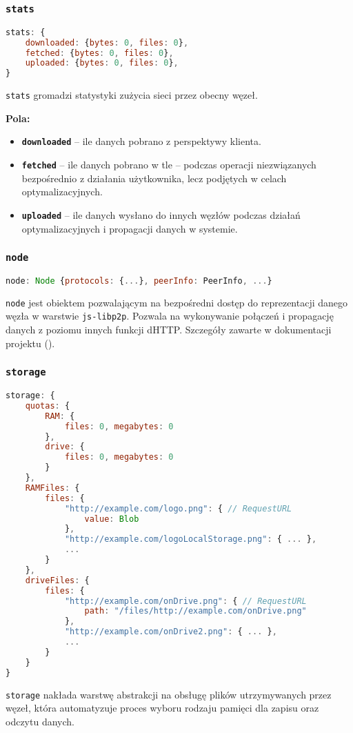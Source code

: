 % 

\subsubsection{\texttt{stats}}
\begin{lstlisting}[language=javascript]
stats: {
    downloaded: {bytes: 0, files: 0},
    fetched: {bytes: 0, files: 0},
    uploaded: {bytes: 0, files: 0},
}
\end{lstlisting}
\texttt{stats} gromadzi statystyki zużycia sieci przez obecny węzeł.

\textbf{Pola:}
\begin{itemize}
    \item \textbf{\texttt{downloaded}} -- ile danych pobrano z perspektywy klienta.
    \item \textbf{\texttt{fetched}} -- ile danych pobrano w tle -- podczas operacji niezwiązanych bezpośrednio z działania użytkownika, lecz podjętych w celach optymalizacyjnych.
    \item \textbf{\texttt{uploaded}} -- ile danych wysłano do innych węzłów podczas działań optymalizacyjnych i propagacji danych w systemie.
\end{itemize}

% 

\subsubsection{\texttt{node}}
\begin{lstlisting}[language=javascript]
    node: Node {protocols: {...}, peerInfo: PeerInfo, ...}
\end{lstlisting}
\texttt{node} jest obiektem pozwalającym na bezpośredni dostęp do reprezentacji danego węzła w warstwie \texttt{js-libp2p}. Pozwala na wykonywanie połączeń i propagację danych z poziomu innych funkcji dHTTP. Szczegóły zawarte w dokumentacji projektu (\cite{libp2pReadme}).

% 

\subsubsection{\texttt{storage}}
\begin{lstlisting}[language=javascript]
storage: {
    quotas: {
        RAM: {
            files: 0, megabytes: 0
        },
        drive: {
            files: 0, megabytes: 0
        }
    },
    RAMFiles: {
        files: {
            "http://example.com/logo.png": { // RequestURL
                value: Blob
            },
            "http://example.com/logoLocalStorage.png": { ... },
            ...
        }
    },
    driveFiles: {
        files: {
            "http://example.com/onDrive.png": { // RequestURL
                path: "/files/http://example.com/onDrive.png"
            },
            "http://example.com/onDrive2.png": { ... },
            ...
        }
    }
}
\end{lstlisting}
\texttt{storage} nakłada warstwę abstrakcji na obsługę plików utrzymywanych przez węzeł, która automatyzuje proces wyboru rodzaju pamięci dla zapisu oraz odczytu danych.

